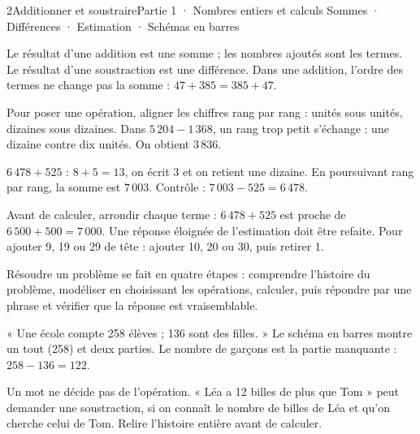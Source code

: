 \begin{ouverture}[calcul]{2}{Additionner et soustraire}{Partie 1 · Nombres entiers et calculs}
{Sommes · Différences · Estimation · Schémas en barres}
\end{ouverture}
\pagestyle{otMain}\essentiel\fontsize{11}{15}\selectfont
{}\label{cours-2-1}
\begin{definition}Le résultat d’une addition est une somme ; les nombres ajoutés sont les termes. Le résultat d’une soustraction est une différence. Dans une addition, l’ordre des termes ne change pas la somme : $47+385=385+47$.\end{definition}
\begin{savoirfaire}Pour poser une opération, aligner les chiffres rang par rang : unités sous unités, dizaines sous dizaines. Dans $5\,204-1\,368$, un rang trop petit s’échange : une dizaine contre dix unités. On obtient $3\,836$.\end{savoirfaire}
\begin{exemple}$6\,478+525$ : $8+5=13$, on écrit 3 et on retient une dizaine. En poursuivant rang par rang, la somme est $7\,003$. Contrôle : $7\,003-525=6\,478$.\end{exemple}
\begin{savoirfaire}Avant de calculer, arrondir chaque terme : $6\,478+525$ est proche de $6\,500+500=7\,000$. Une réponse éloignée de l’estimation doit être refaite. Pour ajouter 9, 19 ou 29 de tête : ajouter 10, 20 ou 30, puis retirer 1.\end{savoirfaire}
\clearpage
{}\label{cours-2-2}
\begin{propriete}Résoudre un problème se fait en quatre étapes : comprendre l’histoire du problème, modéliser en choisissant les opérations, calculer, puis répondre par une phrase et vérifier que la réponse est vraisemblable.\end{propriete}
\label{fig-cours-2-2-cours-barres}

\begin{exemple}« Une école compte 258 élèves ; 136 sont des filles. » Le schéma en barres montre un tout (258) et deux parties. Le nombre de garçons est la partie manquante : $258-136=122$.\end{exemple}
\begin{attention}Un mot ne décide pas de l’opération. « Léa a 12 billes de plus que Tom » peut demander une soustraction, si on connaît le nombre de billes de Léa et qu’on cherche celui de Tom. Relire l’histoire entière avant de calculer.\end{attention}

